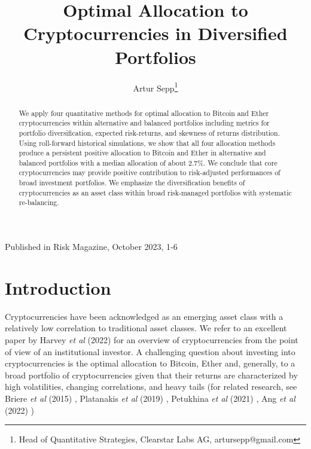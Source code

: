 \documentclass[pdftex,11pt,a4paper] {article}
\date{\displaydate{date}}
\begin{document}
\title{Optimal Allocation to Cryptocurrencies in Diversified Portfolios}

\author{Artur Sepp\thanks{Head of Quantitative Strategies, Clearstar Labs AG, artursepp@gmail.com}}

\maketitle



\begin{center}
Published in Risk Magazine, October 2023, 1-6
\end{center}



\begin{abstract}
We apply four quantitative methods for optimal allocation to Bitcoin and Ether cryptocurrencies within alternative and balanced portfolios including metrics for portfolio diversification, expected risk-returns, and skewness of returns distribution. Using roll-forward historical simulations, we show that all four allocation methods produce a persistent positive allocation to Bitcoin and Ether in alternative and balanced portfolios with a median allocation of about $2.7\%$. We conclude that core cryptocurrencies may provide positive contribution to risk-adjusted performances of broad investment portfolios. We emphasize the diversification benefits of cryptocurrencies as an asset class within broad risk-managed portfolios with systematic re-balancing.
\end{abstract}\vspace*{-1.0\baselineskip}
 



\section{Introduction}

Cryptocurrencies have been acknowledged as an emerging asset class with a relatively low correlation to traditional asset classes. We refer to an excellent paper by Harvey \textit{et al} (2022) \cite{Harvey2022} for an overview of cryptocurrencies from the point of view of an institutional investor. A challenging question about investing into cryptocurrencies is the optimal allocation to Bitcoin, Ether and, generally, to a broad portfolio of cryptocurrencies given that their returns are characterized by high volatilities, changing correlations, and heavy tails (for related research, see Briere \textit{et al} (2015) \cite{Briere2015}, Platanakis \textit{et al} (2019) \cite{Platanakis2019}, Petukhina \textit{et al} (2021) \cite{Petukhina2021}, Ang \textit{et al} (2022) \cite{Ang2022})
\end{document}
